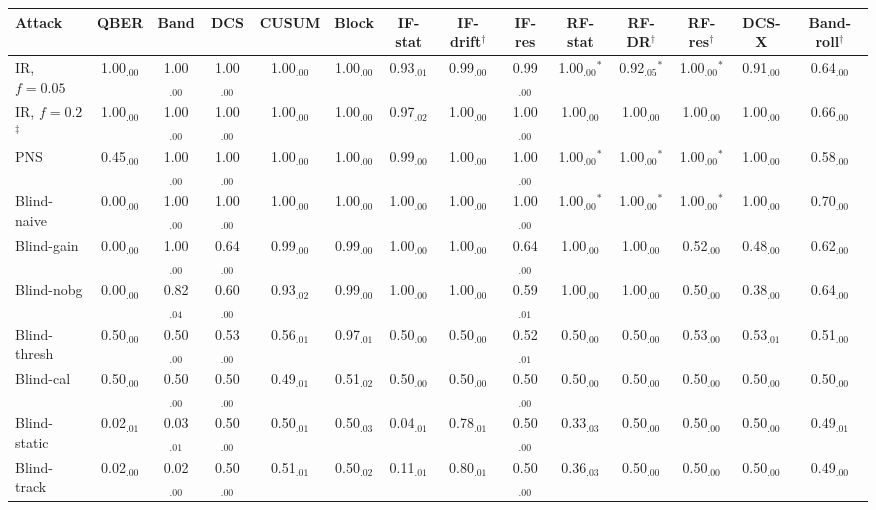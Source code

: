 \begin{tabular}{lccccccccccccc}
\hline
Attack & QBER & Band & DCS & CUSUM & Block & IF-stat & IF-drift$^\dagger$ & IF-res & RF-stat & RF-DR$^\dagger$ & RF-res$^\dagger$ & DCS-X & Band-roll$^\dagger$\\
\hline
IR, $f=0.05$ & 1.00$_{.00}$ & 1.00$_{.00}$ & 1.00$_{.00}$ & 1.00$_{.00}$ & 1.00$_{.00}$ & 0.93$_{.01}$ & 0.99$_{.00}$ & 0.99$_{.00}$ & 1.00$_{.00}$$^*$ & 0.92$_{.05}$$^*$ & 1.00$_{.00}$$^*$ & 0.91$_{.00}$ & 0.64$_{.00}$\\
IR, $f=0.2$$^\ddagger$ & 1.00$_{.00}$ & 1.00$_{.00}$ & 1.00$_{.00}$ & 1.00$_{.00}$ & 1.00$_{.00}$ & 0.97$_{.02}$ & 1.00$_{.00}$ & 1.00$_{.00}$ & 1.00$_{.00}$ & 1.00$_{.00}$ & 1.00$_{.00}$ & 1.00$_{.00}$ & 0.66$_{.00}$\\
PNS & 0.45$_{.00}$ & 1.00$_{.00}$ & 1.00$_{.00}$ & 1.00$_{.00}$ & 1.00$_{.00}$ & 0.99$_{.00}$ & 1.00$_{.00}$ & 1.00$_{.00}$ & 1.00$_{.00}$$^*$ & 1.00$_{.00}$$^*$ & 1.00$_{.00}$$^*$ & 1.00$_{.00}$ & 0.58$_{.00}$\\
Blind-naive & 0.00$_{.00}$ & 1.00$_{.00}$ & 1.00$_{.00}$ & 1.00$_{.00}$ & 1.00$_{.00}$ & 1.00$_{.00}$ & 1.00$_{.00}$ & 1.00$_{.00}$ & 1.00$_{.00}$$^*$ & 1.00$_{.00}$$^*$ & 1.00$_{.00}$$^*$ & 1.00$_{.00}$ & 0.70$_{.00}$\\
Blind-gain & 0.00$_{.00}$ & 1.00$_{.00}$ & 0.64$_{.00}$ & 0.99$_{.00}$ & 0.99$_{.00}$ & 1.00$_{.00}$ & 1.00$_{.00}$ & 0.64$_{.00}$ & 1.00$_{.00}$ & 1.00$_{.00}$ & 0.52$_{.00}$ & 0.48$_{.00}$ & 0.62$_{.00}$\\
Blind-nobg & 0.00$_{.00}$ & 0.82$_{.04}$ & 0.60$_{.00}$ & 0.93$_{.02}$ & 0.99$_{.00}$ & 1.00$_{.00}$ & 1.00$_{.00}$ & 0.59$_{.01}$ & 1.00$_{.00}$ & 1.00$_{.00}$ & 0.50$_{.00}$ & 0.38$_{.00}$ & 0.64$_{.00}$\\
Blind-thresh & 0.50$_{.00}$ & 0.50$_{.00}$ & 0.53$_{.00}$ & 0.56$_{.01}$ & 0.97$_{.01}$ & 0.50$_{.00}$ & 0.50$_{.00}$ & 0.52$_{.01}$ & 0.50$_{.00}$ & 0.50$_{.00}$ & 0.53$_{.00}$ & 0.53$_{.01}$ & 0.51$_{.00}$\\
Blind-cal & 0.50$_{.00}$ & 0.50$_{.00}$ & 0.50$_{.00}$ & 0.49$_{.01}$ & 0.51$_{.02}$ & 0.50$_{.00}$ & 0.50$_{.00}$ & 0.50$_{.00}$ & 0.50$_{.00}$ & 0.50$_{.00}$ & 0.50$_{.00}$ & 0.50$_{.00}$ & 0.50$_{.00}$\\
Blind-static & 0.02$_{.01}$ & 0.03$_{.01}$ & 0.50$_{.00}$ & 0.50$_{.01}$ & 0.50$_{.03}$ & 0.04$_{.01}$ & 0.78$_{.01}$ & 0.50$_{.00}$ & 0.33$_{.03}$ & 0.50$_{.00}$ & 0.50$_{.00}$ & 0.50$_{.00}$ & 0.49$_{.01}$\\
Blind-track & 0.02$_{.00}$ & 0.02$_{.00}$ & 0.50$_{.00}$ & 0.51$_{.01}$ & 0.50$_{.02}$ & 0.11$_{.01}$ & 0.80$_{.01}$ & 0.50$_{.00}$ & 0.36$_{.03}$ & 0.50$_{.00}$ & 0.50$_{.00}$ & 0.50$_{.00}$ & 0.49$_{.00}$\\

\end{tabular}

